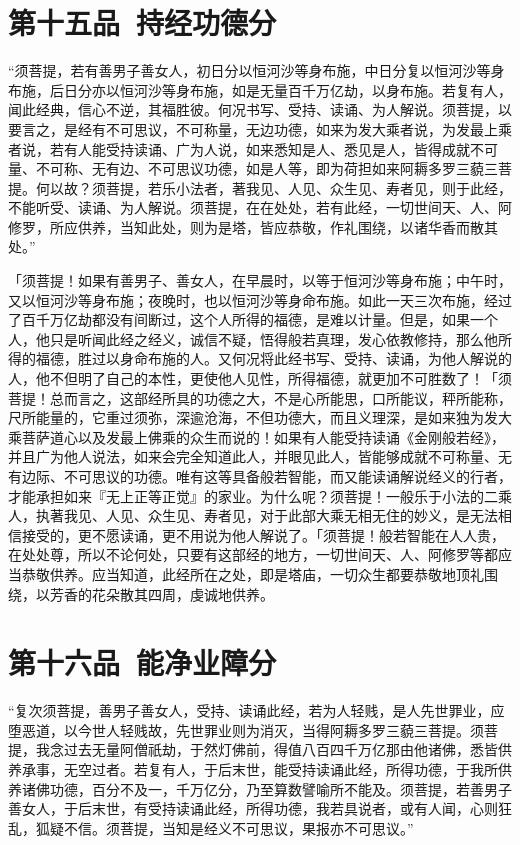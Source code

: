 \documentclass[12pt,twoside,openany]{book}
\newcommand{\kai}[1]{{\CJKfamily{kai}#1}}
\begin{document}
\chapter{第十五品\ 持经功德分}
“须菩提，若有善男子善女人，初日分以恒河沙等身布施，中日分复以恒河沙等身布施，后日分亦以恒河沙等身布施，如是无量百千万亿劫，以身布施。若复有人，闻此经典，信心不逆，其福胜彼。何况书写、受持、读诵、为人解说。须菩提，以要言之，是经有不可思议，不可称量，无边功德，如来为发大乘者说，为发最上乘者说，若有人能受持读诵、广为人说，如来悉知是人、悉见是人，皆得成就不可量、不可称、无有边、不可思议功德，如是人等，即为荷担如来阿耨多罗三藐三菩提。何以故？须菩提，若乐小法者，著我见、人见、众生见、寿者见，则于此经，不能听受、读诵、为人解说。须菩提，在在处处，若有此经，一切世间天、人、阿修罗，所应供养，当知此处，则为是塔，皆应恭敬，作礼围绕，以诸华香而散其处。”

\kai{「须菩提！如果有善男子、善女人，在早晨时，以等于恒河沙等身布施；中午时，又以恒河沙等身布施；夜晚时，也以恒河沙等身命布施。如此一天三次布施，经过了百千万亿劫都没有间断过，这个人所得的福德，是难以计量。但是，如果一个人，他只是听闻此经之经义，诚信不疑，悟得般若真理，发心依教修持，那么他所得的福德，胜过以身命布施的人。又何况将此经书写、受持、读诵，为他人解说的人，他不但明了自己的本性，更使他人见性，所得福德，就更加不可胜数了！「须菩提！总而言之，这部经所具的功德之大，不是心所能思，口所能议，秤所能称，尺所能量的，它重过须弥，深逾沧海，不但功德大，而且义理深，是如来独为发大乘菩萨道心以及发最上佛乘的众生而说的！如果有人能受持读诵《金刚般若经》，并且广为他人说法，如来会完全知道此人，并眼见此人，皆能够成就不可称量、无有边际、不可思议的功德。唯有这等具备般若智能，而又能读诵解说经义的行者，才能承担如来『无上正等正觉』的家业。为什么呢？须菩提！一般乐于小法的二乘人，执著我见、人见、众生见、寿者见，对于此部大乘无相无住的妙义，是无法相信接受的，更不愿读诵，更不用说为他人解说了。「须菩提！般若智能在人人贵，在处处尊，所以不论何处，只要有这部经的地方，一切世间天、人、阿修罗等都应当恭敬供养。应当知道，此经所在之处，即是塔庙，一切众生都要恭敬地顶礼围绕，以芳香的花朵散其四周，虔诚地供养。}

\chapter{第十六品\ 能净业障分}
“复次须菩提，善男子善女人，受持、读诵此经，若为人轻贱，是人先世罪业，应堕恶道，以今世人轻贱故，先世罪业则为消灭，当得阿耨多罗三藐三菩提。须菩提，我念过去无量阿僧祇劫，于然灯佛前，得值八百四千万亿那由他诸佛，悉皆供养承事，无空过者。若复有人，于后末世，能受持读诵此经，所得功德，于我所供养诸佛功德，百分不及一，千万亿分，乃至算数譬喻所不能及。须菩提，若善男子善女人，于后末世，有受持读诵此经，所得功德，我若具说者，或有人闻，心则狂乱，狐疑不信。须菩提，当知是经义不可思议，果报亦不可思议。”
\end{document}

